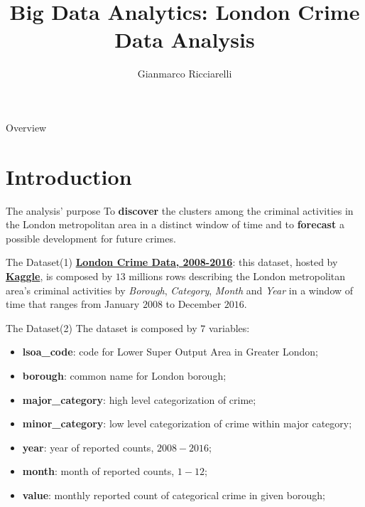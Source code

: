 \documentclass[12pt]{beamer}
\title{Big Data Analytics: London Crime Data Analysis}
\author{Gianmarco Ricciarelli\inst{1}}
\institute{\inst{1}University of Pisa, \\
           \email{gianmarcoricciarelli@gmail.com}, \\
           GitHub: https://github.com/germz01}
\date{}
\begin{document}
    \maketitle

    \begin{frame}{Overview}
        \tableofcontents
    \end{frame}

    \section{Introduction} %
    \label{sec:introduction}
        \begin{frame}{The analysis' purpose}
            To \textbf{discover} the clusters among the criminal activities in the London metropolitan area
            in a distinct window of time and to \textbf{forecast} a possible development for future crimes.
        \end{frame}

        \begin{frame}{The Dataset(1)}
            \href{https://www.kaggle.com/jboysen/london-crime}{\textbf{London Crime Data, 2008-2016}}: this
            dataset, hosted by \href{https://www.kaggle.com}{\textbf{Kaggle}}, is composed by $13$
            millions rows describing the London metropolitan area's criminal activities by \textit{Borough},
            \textit{Category}, \textit{Month} and \textit{Year} in a window of time that ranges from
            January $2008$ to December $2016$.
        \end{frame}

        \begin{frame}{The Dataset(2)}
            The dataset is composed by $7$ variables:

            \begin{itemize}
                \item \textbf{lsoa\_code}: code for Lower Super Output Area in Greater London;
                \item \textbf{borough}: common name for London borough;
                \item \textbf{major\_category}: high level categorization of crime;
                \item \textbf{minor\_category}: low level categorization of crime within major category;
                \item \textbf{year}: year of reported counts, $2008-2016$;
                \item \textbf{month}: month of reported counts, $1-12$;
                \item \textbf{value}: monthly reported count of categorical crime in given borough;
            \end{itemize}
        \end{frame}
\end{document}
